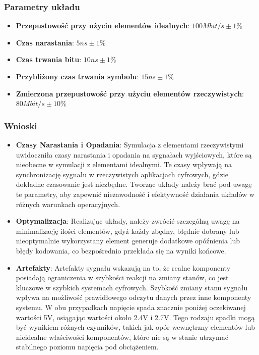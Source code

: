 \documentclass{article}
\begin{document}
\subsubsection {Parametry układu}
\begin{itemize}
\item \textbf{Przepustowość przy użyciu elementów idealnych}: \( 100Mbit/s \pm 1\% \)
\item \textbf{Czas narastania}: \( 5ns \pm 1\% \)
\item \textbf{Czas trwania bitu}: \( 10ns \pm 1\% \)
\item \textbf{Przybliżony czas trwania symbolu}: \( 15ns \pm 1\% \)
\item \textbf{Zmierzona przepustowość przy użyciu elementów rzeczywistych}:  \( 80Mbit/s \pm 10\% \)
\end{itemize}

\subsubsection {Wnioski}
\begin{itemize}
\item \textbf{Czasy Narastania i Opadania}: Symulacja z elementami rzeczywistymi uwidoczniła czasy narastania i opadania na sygnałach wyjściowych, które są nieobecne w symulacji z elementami idealnymi. Te czasy wpływają na synchronizację sygnału w rzeczywistych aplikacjach cyfrowych, gdzie dokładne czasowanie jest niezbędne. Tworząc układy należy brać pod uwagę te parametry, aby zapewnić niezawodność i efektywność działania układów w różnych warunkach operacyjnych.

\item \textbf{Optymalizacja}: Realizując układy, należy zwrócić szczególną uwagę na minimalizację ilości elementów, gdyż każdy zbędny, błędnie dobrany lub nieoptymalnie wykorzystany element generuje dodatkowe opóźnienia lub błędy kodowania, co bezpośrednio przekłada się na wyniki końcowe.
\newpage
\item \textbf{Artefakty}: Artefakty sygnału wskazują na to, że realne komponenty posiadają ograniczenia w szybkości reakcji na zmiany stanów, co jest kluczowe w szybkich systemach cyfrowych. Szybkość zmiany stanu sygnału wpływa na możliwość prawidłowego odczytu danych przez inne komponenty systemu. W obu przypadkach napięcie spada znacznie poniżej oczekiwanej wartości 5V, osiągając wartości około 2.4V i 2.7V. Tego rodzaju spadki mogą być wynikiem różnych czynników, takich jak opór wewnętrzny elementów lub nieidealne właściwości komponentów, które nie są w stanie utrzymać stabilnego poziomu napięcia pod obciążeniem.

\end{itemize}
\end{document}
